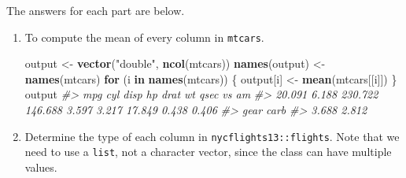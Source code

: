 \documentclass[]{book}
\newenvironment{Shaded}{\begin{snugshade}}{\end{snugshade}}
\newcommand{\CommentTok}[1]{\textcolor[rgb]{0.56,0.35,0.01}{\textit{#1}}}
\newcommand{\ControlFlowTok}[1]{\textcolor[rgb]{0.13,0.29,0.53}{\textbf{#1}}}
\newcommand{\KeywordTok}[1]{\textcolor[rgb]{0.13,0.29,0.53}{\textbf{#1}}}
\newcommand{\NormalTok}[1]{#1}
\newcommand{\StringTok}[1]{\textcolor[rgb]{0.31,0.60,0.02}{#1}}
\theoremstyle{plain}
\theoremstyle{remark}
\begin{document}
The answers for each part are below.

\begin{enumerate}
\def\labelenumi{\arabic{enumi}.}
\item
  To compute the mean of every column in \texttt{mtcars}.

\begin{Shaded}
\begin{Highlighting}[]
\NormalTok{output <-}\StringTok{ }\KeywordTok{vector}\NormalTok{(}\StringTok{"double"}\NormalTok{, }\KeywordTok{ncol}\NormalTok{(mtcars))}
\KeywordTok{names}\NormalTok{(output) <-}\StringTok{ }\KeywordTok{names}\NormalTok{(mtcars)}
\ControlFlowTok{for}\NormalTok{ (i }\ControlFlowTok{in} \KeywordTok{names}\NormalTok{(mtcars)) \{}
\NormalTok{  output[i] <-}\StringTok{ }\KeywordTok{mean}\NormalTok{(mtcars[[i]])}
\NormalTok{\}}
\NormalTok{output}
\CommentTok{#>     mpg     cyl    disp      hp    drat      wt    qsec      vs      am }
\CommentTok{#>  20.091   6.188 230.722 146.688   3.597   3.217  17.849   0.438   0.406 }
\CommentTok{#>    gear    carb }
\CommentTok{#>   3.688   2.812}
\end{Highlighting}
\end{Shaded}
\item
  Determine the type of each column in \texttt{nycflights13::flights}.
  Note that we need to use a \texttt{list}, not a character vector,
  since the class can have multiple values.


\end{enumerate}
\end{document}
